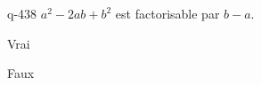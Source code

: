 \begin{truefalse}{q-438}
$a^2-2ab+b^2$ est factorisable par $b-a$.
\item* Vrai
\item Faux
\end{truefalse}

